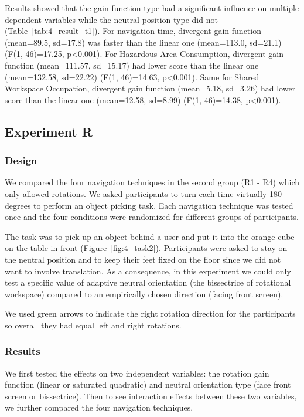 Results showed that the gain function type had a significant influence on multiple dependent variables while the neutral position type did not (Table~\ref{tab:4_result_t1}). For navigation time, divergent gain function (mean=89.5, sd=17.8) was faster than the linear one (mean=113.0, sd=21.1) (F(1, 46)=17.25, p\textless 0.001). For Hazardous Area Consumption, divergent gain function (mean=111.57, sd=15.17) had lower score than the linear one (mean=132.58, sd=22.22) (F(1, 46)=14.63, p\textless 0.001). Same for Shared Workspace Occupation, divergent gain function (mean=5.18, sd=3.26) had lower score than the linear one (mean=12.58, sd=8.99) (F(1, 46)=14.38, p\textless 0.001).


\subsection{Experiment R}
\subsubsection{Design}
We compared the four navigation techniques in the second group (R1 - R4) which only allowed rotations. We asked participants to turn each time virtually 180 degrees to perform an object picking task. Each navigation technique was tested once and the four conditions were randomized for different groups of participants.

The task was to pick up an object behind a user and put it into the orange cube on the table in front (Figure~\ref{fig:4_task2}). Participants were asked to stay on the neutral position and to keep their feet fixed on the floor since we did not want to involve translation. As a consequence, in this experiment we could only test a specific value of adaptive neutral orientation (the bissectrice of rotational workspace) compared to an empirically chosen direction (facing front screen).

We used green arrows to indicate the right rotation direction for the participants so overall they had equal left and right rotations.

\subsubsection{Results}
We first tested the effects on two independent variables: the rotation gain function (linear or saturated quadratic) and neutral orientation type (face front screen or bissectrice). Then to see interaction effects between these two variables, we further compared the four navigation techniques.

